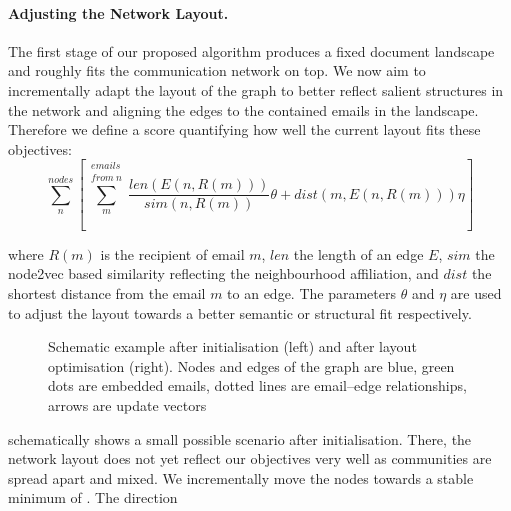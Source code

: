 \paragraph{Adjusting the Network Layout.}
The first stage of our proposed algorithm produces a fixed document landscape and roughly fits the communication network on top. 
We now aim to incrementally adapt the layout of the graph to better reflect salient structures in the network and aligning the edges to the contained emails in the landscape.
Therefore we define a score quantifying how well the current layout fits these objectives:
\begin{equation}
\sum_{n}^{nodes}\left[\sum_{m}^{\substack{emails\\from~n}}\frac{len(E(n, R(m)))}{sim(n, R(m))}\theta+dist(m, E(n,R(m)))\eta\right]
\label{eq:score}
\end{equation}

where $R(m)$ is the recipient of email $m$, $len$ the length of an edge $E$, $sim$ the node2vec based similarity reflecting the neighbourhood affiliation, and $dist$ the shortest distance from the email $m$ to an edge. The parameters $\theta$ and $\eta$ are used to adjust the layout towards a better semantic or structural fit respectively.

\begin{figure}
	\caption{Schematic example after initialisation (left) and after layout optimisation (right). Nodes and edges of the graph are blue, green dots are embedded emails, dotted lines are email--edge relationships, arrows are update vectors}
	\label{fig:minisample}
\end{figure}

 schematically shows a small possible scenario after initialisation.
There, the network layout does not yet reflect our objectives very well as communities are spread apart and mixed.
We incrementally move the nodes towards a stable minimum of .
The direction 

